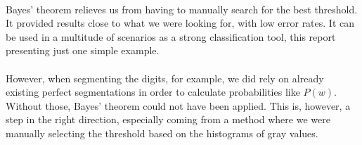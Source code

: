 \paragraph{}
Bayes' theorem relieves us from having to manually search for the best threshold.
It provided results close to what we were looking for, with low error rates.
It can be used in a multitude of scenarios as a strong classification tool, this report presenting just one simple example.
\paragraph{}
However, when segmenting the digits, for example, we did rely on already existing perfect segmentations in order to calculate probabilities like $P(w)$.
Without those, Bayes' theorem could not have been applied.
This is, however, a step in the right direction, especially coming from a method where we were manually selecting the threshold based on the histograms of gray values.